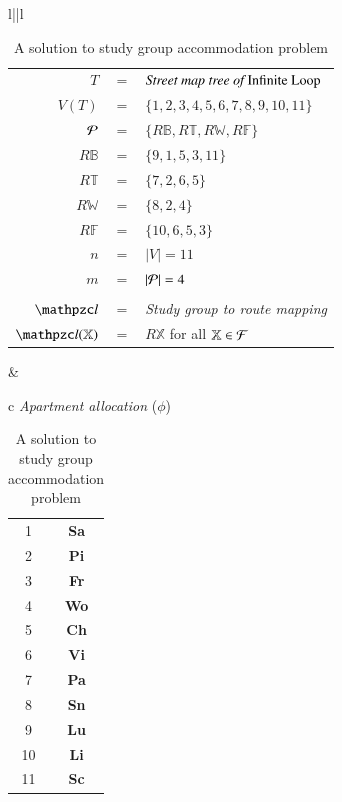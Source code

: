 \documentclass[MS,synopsis]{iitmdiss}
\def \figtabsize {\footnotesize}
\def \xLLL {\mathbb{B}}
\def \xGGG {\mathbb{T}}
\def \xBBB {\mathbb{W}}
\def \xTTT {\mathbb{F}}
\def \xPa {{\bf Pa}}
\def \xPi {{\bf Pi}}
\def \xSn {{\bf Sn}}
\def \xWo {{\bf Wo}}
\def \xVi {{\bf Vi}}
\def \xLi {{\bf Li}}
\def \xCh {{\bf Ch}}
\def \xSa {{\bf Sa}}
\def \xFr {{\bf Fr}}
\def \xSc {{\bf Sc}}
\def \xLu {{\bf Lu}}
\def \residenceblock {{\em Infinite Loop}}
\begin{document}
\begin{table}[htbp]
  \centering
  {\footnotesize    
    \begin{tabular}{l||l}
      \begin{tabular}{rcl}
        $T $&$=$&$ \text{\em Street map tree of \residenceblock}$\\
        $V(T) $&$=$&$ \{ 1, 2, 3, 4, 5, 6, 7, 8, 9, 10, 11 \}$\\
        ${\cal P} $&$=$&$ \{R\xLLL, R\xGGG, R\xBBB, R\xTTT\}$\\
        $R\xLLL $&$=$&$ \{9, 1, 5, 3, 11\}$\\
        $R\xGGG $&$=$&$ \{7, 2, 6, 5\}$\\
        $R\xBBB $&$=$&$ \{8, 2, 4 \}$\\
        $R\xTTT $&$=$&$ \{10, 6, 5, 3\}$\\
        $n $&$=$&$ |V| = 11$\\
        $m $&$=$&$ |{\cal P}| = 4$\\\\
        $\cl $&$=$& {\em Study group to route mapping}\\        
        $\cl(\mathbb{X}) $&$=$&  $R\mathbb{X}$ for all $\mathbb{X} \in
        {\cal F}$
      \end{tabular} & 
      \begin{tabular}{c}
       {\em Apartment allocation }($\phi$)\\
                    \begin{tabular}{c|c}                      
                      1  & \xSa\\
                      2  & \xPi\\
                      3  & \xFr\\
                      4  & \xWo\\
                      5  & \xCh\\
                      6  & \xVi\\
                      7  & \xPa\\
                      8  & \xSn\\
                      9  & \xLu\\
                      10 & \xLi\\
                      11 & \xSc                     
                    \end{tabular}
      \end{tabular}\\
    \end{tabular}
  }
  \caption{\figtabsize A solution to study group accommodation problem}
  \label{tab:iltree}
\end{table}
\end{document}
